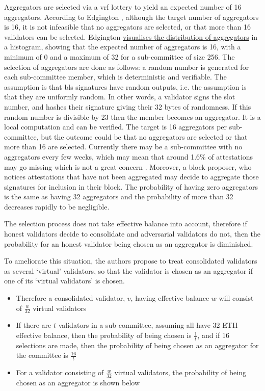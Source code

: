 \documentclass[UTF8]{article}
\begin{document}
Aggregators are selected via a \gls{vrf} lottery to yield an expected number of 16 aggregators. According to Edgington \cite{Edgington2023}, although the target number of aggregators is 16, it is not infeasible that no aggregators are selected, or that more than 16 validators can be selected. Edgington \href{https://eth2book.info/capella/part2/building_blocks/aggregator/}{visualises the distribution of aggregators} in a histogram, showing that the expected number of aggregators is 16, with a minimum of 0 and a maximum of 32 for a sub-committee of size 256. The selection of aggregators are done as follows: a random number is generated for each sub-committee member, which is deterministic and verifiable. The assumption is that \gls{bls} signatures have random outputs, i.e. the assumption is that they are uniformly random. In other words, a validator signs the slot number, and hashes their signature giving their 32 bytes of randomness. If this random number is divisible by 23 then the member becomes an aggregator. It is a local computation and can be verified. The target is 16 aggregators per sub-committee, but the outcome could be that no aggregators are selected or that more than 16 are selected. Currently there may be a sub-committee with no aggregators every few weeks, which may mean that around 1.6\% of attestations may go missing which is not a great concern \cite{Edgington2023}.  Moreover, a block proposer, who notices attestations that have not been aggregated may decide to aggregate those signatures for inclusion in their block. The probability of having zero aggregators is the same as having 32 aggregators and the probability of more than 32 decreases rapidly to be negligible.


The selection process does not take effective balance into account, therefore if honest validators decide to consolidate and adversarial validators do not, then the probability for an honest validator being chosen as an aggregator is diminished.  

To ameliorate this situation, the authors propose to treat consolidated validators as several `virtual' validators, so that the validator is chosen as an aggregator if one of its `virtual validators' is chosen.

\begin{itemize}
\item Therefore a consolidated validator, $v$, having effective balance $w$ will consist of $\frac{w}{32}$ virtual validators
\item If there are $t$ validators in a sub-committee, assuming all have 32 ETH effective balance, then the probability of being chosen is $\frac{1}{t}$, and if 16 selections are made, then the probability of being chosen as an aggregator for the committee is $\frac{16}{t}$
\item For a validator consisting of $\frac{w}{32}$ virtual validators, the probability of being chosen as an aggregator is shown below
\end{itemize}
\end{document}
